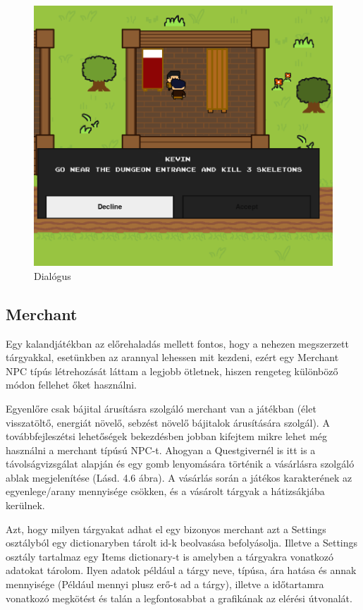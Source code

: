 \begin{figure}[H]
    \centering
    \includegraphics[width=14.0truecm]{images/dialogue.png}
    \caption{Dialógus}
    \label{fig:Dialógus}
\end{figure}

\subsection{Merchant}

Egy kalandjátékban az előrehaladás mellett fontos, hogy a nehezen megszerzett tárgyakkal, esetünkben az arannyal lehessen mit kezdeni, ezért egy Merchant NPC típús létrehozását láttam a legjobb ötletnek, hiszen rengeteg különböző módon fellehet őket használni. 

Egyenlőre csak bájital árusításra szolgáló merchant van a játékban (élet visszatöltő, energiát növelő, sebzést növelő bájitalok árusítására szolgál). A továbbfejleszétsi lehetőségek bekezdésben jobban kifejtem mikre lehet még használni a merchant típúsú NPC-t.  Ahogyan a Questgivernél is itt is a távolságvizsgálat alapján és egy gomb lenyomására történik a vásárlásra szolgáló ablak megjelenítése (Lásd. 4.6 ábra). A vásárlás során a játékos karakterének az egyenlege/arany mennyisége csökken, és a vásárolt tárgyak a hátizsákjába kerülnek.

Azt, hogy milyen tárgyakat adhat el egy bizonyos merchant azt a Settings osztályból egy dictionaryben tárolt id-k beolvasása befolyásolja. Illetve a Settings osztály tartalmaz egy Items dictionary-t is amelyben a tárgyakra vonatkozó adatokat tárolom. Ilyen adatok például a tárgy neve, típúsa, ára hatása és annak mennyisége (Például mennyi plusz erő-t ad a tárgy), illetve a időtartamra vonatkozó megkötést és talán a legfontosabbat a grafikának az elérési útvonalát.  

